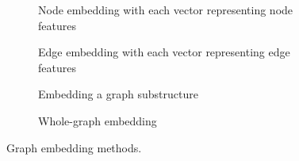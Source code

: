\begin{figure*}[htbp]
	\centering
	
	\begin{subfigure}[b]{0.48\textwidth}
		\centering
		
		\caption{Node embedding with each vector representing node features}
		\label{fig:nodeEmbedding}
	\end{subfigure}
	\hfill
	\begin{subfigure}[b]{0.48\textwidth}
		\centering
		
		\caption{Edge embedding with each vector representing edge features}
		\label{fig:edgeEmbedding}
	\end{subfigure}
	
	\vspace{0.5em}
	
	\begin{subfigure}[b]{0.48\textwidth}
		\centering
		
		\caption{Embedding a graph substructure}
		\label{fig:substructureEmbedding}
	\end{subfigure}
	\hfill
	\begin{subfigure}[b]{0.48\textwidth}
		\centering
		
		\caption{Whole-graph embedding}
		\label{fig:wholeGraphEmbedding}
	\end{subfigure}
	\caption{Graph embedding methods.}
	\label{fig:GraphEmbeddingMethods}
\end{figure*}





%	
%		
%		
%	
%		
%	
%		
%		
%		
%		
%		
%		
%	



